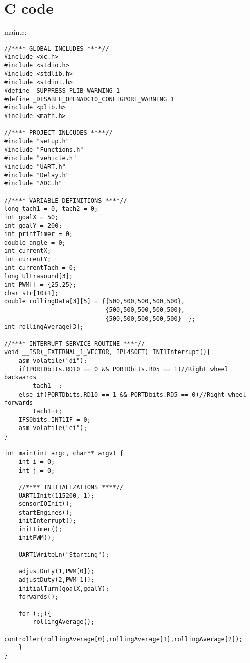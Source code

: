 \section{C code}
main.c:

\begin{lstlisting}
//**** GLOBAL INCLUDES ****//
#include <xc.h>
#include <stdio.h>
#include <stdlib.h>
#include <stdint.h>
#define _SUPPRESS_PLIB_WARNING 1   
#define _DISABLE_OPENADC10_CONFIGPORT_WARNING 1  
#include <plib.h>
#include <math.h>

//**** PROJECT INLCUDES ****//
#include "setup.h"
#include "Functions.h"
#include "vehicle.h"
#include "UART.h"
#include "Delay.h"
#include "ADC.h"

//**** VARIABLE DEFINITIONS ****//
long tach1 = 0, tach2 = 0;
int goalX = 50;
int goalY = 200;
int printTimer = 0;
double angle = 0;
int currentX;
int currentY;
int currentTach = 0;
long Ultrasound[3];
int PWM[] = {25,25};
char str[10+1];
double rollingData[3][5] = {{500,500,500,500,500},
                            {500,500,500,500,500},
                            {500,500,500,500,500}  };
int rollingAverage[3];

//**** INTERRUPT SERVICE ROUTINE ****//
void __ISR(_EXTERNAL_1_VECTOR, IPL4SOFT) INT1Interrupt(){
    asm volatile("di");
    if(PORTDbits.RD10 == 0 && PORTDbits.RD5 == 1)//Right wheel backwards
        tach1--;
    else if(PORTDbits.RD10 == 1 && PORTDbits.RD5 == 0)//Right wheel forwards
        tach1++;
    IFS0bits.INT1IF = 0;
    asm volatile("ei");
}

int main(int argc, char** argv) {
    int i = 0;
    int j = 0;
    
    //**** INITIALIZATIONS ****//
    UART1Init(115200, 1);
    sensorIOInit();
    startEngines();
    initInterrupt();
    initTimer();
    initPWM();
    
    UART1WriteLn("Starting");
    
    adjustDuty(1,PWM[0]);
    adjustDuty(2,PWM[1]);
    initialTurn(goalX,goalY);
    forwards();
    
    for (;;){
        rollingAverage();
        controller(rollingAverage[0],rollingAverage[1],rollingAverage[2]);
    }
}
\end{lstlisting}
\newpage

